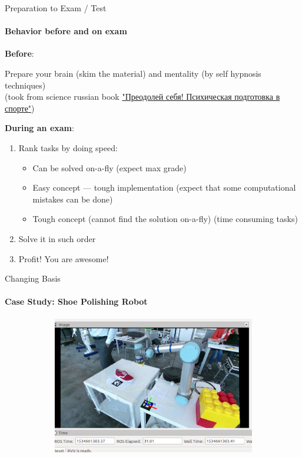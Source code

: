 \documentclass[aspectratio=169,notes]{beamer}
\begin{document}
\begin{frame}[t]{Preparation to Exam / Test}
    \vspace{-0.5cm}
    \framesubtitle{Behavior before and on exam}
    \textbf{Before}:

    Prepare your brain (skim the material) and mentality (by self hypnosis techniques) \\ (took from science russian book \href{https://yadi.sk/d/uZhNSQW637Q3v7}{"Преодолей себя! Психическая подготовка в спорте"}) \smallskip

    \textbf{During an exam}:
    \begin{enumerate}
        \item Rank tasks by doing speed: \begin{itemize}
                  \item Can be solved on-a-fly (expect max grade)
                  \item Easy concept --- tough implementation (expect that some computational mistakes can be done)
                  \item Tough concept (cannot find the solution on-a-fly) (time consuming tasks)
              \end{itemize}
        \item Solve it in such order
        \item Profit! You are awesome!
    \end{enumerate}
\end{frame}

\begin{frame}[t]{Changing Basis}
    \framesubtitle{Case Study: Shoe Polishing Robot}
    \vspace{-0.6cm}
    \begin{figure}[H]
        \centering\includegraphics[height=6cm,width=1\textwidth,keepaspectratio]{change_basis_practice_2.png}
        \label{fig:change_basis_practice_2.png}
    \end{figure}
\end{frame}
\end{document}
